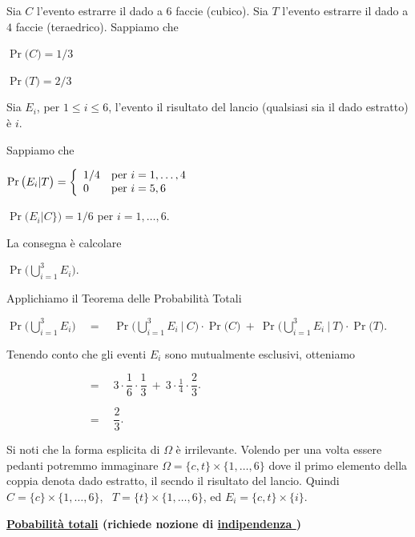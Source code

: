 \documentclass[11pt,openany]{book}
\begin{document}
\begin{soluzione}
Sia $C$ l'evento estrarre il dado a $6$ faccie (cubico). 
Sia $T$ l'evento estrarre il dado a $4$ faccie (teraedrico). 
Sappiamo che 

\qquad$\Pr\big(C\big)=1/3$ 

\qquad$\Pr\big(T\big)=2/3$ 

Sia $E_i$, per $1\le i\le 6$, l'evento  il risultato del lancio (qualsiasi sia il dado estratto) \`e $i$.

Sappiamo che

\qquad$\Pr\big(E_i\vert T\big)=\left\{
\begin{array}[c]{ll}
    1/4&\textrm{per }i=1,\dots,4\\
    0&\textrm{per }i=5, 6\\
\end{array}\right.$

\qquad$\Pr\big(E_i\vert C\}\big)=1/6$ per $i=1,\dots,6$.

La consegna è calcolare

\qquad$\displaystyle\Pr\bigg(\bigcup_{i=1}^3E_i\bigg)$.

Applichiamo il Teorema delle Probabilità Totali

\qquad$\displaystyle\Pr\bigg(\bigcup_{i=1}^3E_i\bigg)\quad=\quad
\Pr\bigg(\bigcup_{i=1}^3E_i\ \Big|\ C\bigg)\cdot\Pr\big(C\big)\ +\ 
\Pr\bigg(\bigcup_{i=1}^3E_i\ \Big|\ T\bigg)\cdot\Pr\big(T\big)
$.

Tenendo conto che gli eventi $E_i$ sono mutualmente esclusivi, otteniamo

\qquad$\displaystyle\phantom{\Pr\bigg(\bigcup_{i=1}^3E_i\bigg)}\quad=\quad
3\cdot\dfrac16\cdot\dfrac13\ +\ 
3\cdot\frac14\cdot\dfrac23
$.

\qquad$\displaystyle\phantom{\Pr\bigg(\bigcup_{i=1}^3E_i\bigg)}\quad=\quad
\dfrac{2}{3}
$.
\end{soluzione}

Si noti che la forma esplicita di $\Omega$ \`e irrilevante.
Volendo per una volta essere pedanti potremmo immaginare $\Omega=\{c,t\}\times\{1,\dots,6\}$ dove il primo elemento della coppia denota dado estratto, il secndo il risultato del lancio.
Quindi $C=\{c\}\times\{1,\dots,6\}$, \ $T=\{t\}\times\{1,\dots,6\}$, ed $E_i=\{c,t\}\times\{i\}$.


\clearpage
\hfill\textbf{{\color{brown}\hyperref[TeoremaProbabilitaTotali]{Pobabilità totali} \faShare} (richiede nozione di \hyperref[indipendenza]{indipendenza \faShare})}
\end{document}
